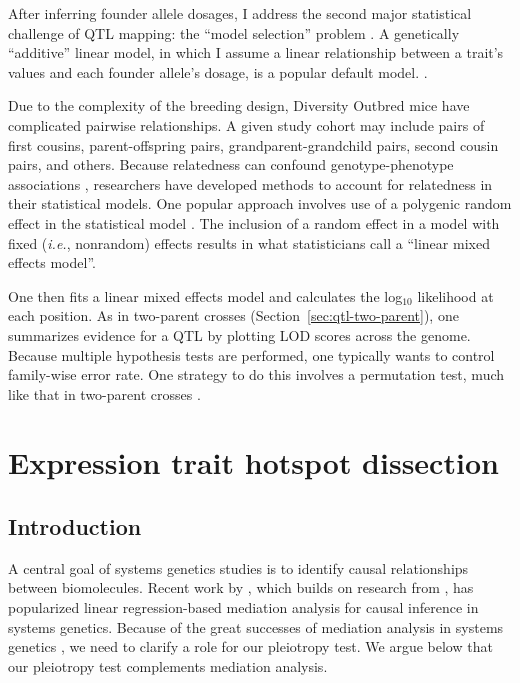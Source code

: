 \documentclass[oneside]{book}\usepackage[]{graphicx}\usepackage[]{color}
\begin{document}
\begin{titlepage}
After inferring founder allele dosages, I address the
second major statistical challenge of
QTL mapping: the ``model selection'' problem \citep{broman2009guide}.
A genetically ``additive'' linear model, in which
I assume a linear relationship between
a trait's values and each founder allele's dosage, is a popular default model.
\citep{gatti2014quantitative,broman2019rqtl2}.




Due to the complexity of the breeding design, Diversity Outbred mice
have
complicated pairwise relationships. A given study cohort may include pairs of first
cousins, parent-offspring pairs, grandparent-grandchild pairs, second cousin pairs, and others.
Because relatedness can confound genotype-phenotype associations
\citep{yang2014advantages}, researchers have developed methods to account
for relatedness in their statistical models. One popular approach involves
use of a polygenic random effect in the statistical model \citep{kang2008efficient}.
The inclusion of a random effect in a model with fixed (\emph{i.e.}, nonrandom)
effects results in what statisticians call a ``linear mixed effects model''.

One then fits a linear mixed effects model and calculates the log$_{10}$ likelihood at each position. As in two-parent crosses (Section~\ref{sec:qtl-two-parent}), one summarizes evidence for a QTL by plotting LOD scores across the genome. Because multiple hypothesis tests are performed, one typically wants to control family-wise error rate. One strategy to do this involves a permutation test, much like that in two-parent crosses \citep{churchill1994empirical}.


\section{Expression trait hotspot dissection}\label{sec:hotspot-dissection}
\subsection{Introduction}

A central goal of systems genetics studies is to identify causal relationships between biomolecules.
Recent work by \citet{chick2016defining}, which builds on research from \citet{baron1986moderator}, has popularized linear regression-based mediation analysis for causal inference in systems genetics.
Because of the great successes of mediation analysis in systems genetics
\citep{chick2016defining,keller2018genetic}, we need to clarify a role for our pleiotropy test.
We argue below that our pleiotropy test complements mediation analysis.


\end{titlepage}
\end{document}
